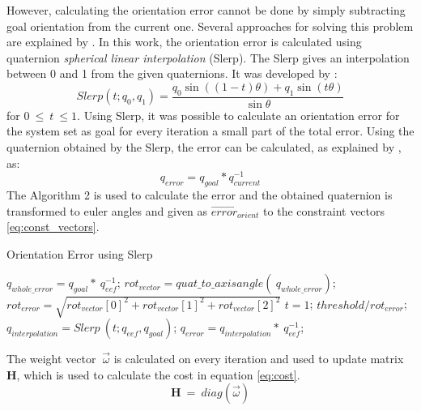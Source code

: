 However, calculating the orientation error cannot be done by simply subtracting goal orientation from the current one. Several approaches for solving this problem are explained by \cite{siciliano}. In this work, the orientation error is calculated using quaternion \textit{spherical linear interpolation} (Slerp). The Slerp gives an interpolation between 0 and 1 from the given quaternions. It was developed by \cite{slerp}:
$$ Slerp(t;q_0,q_1)=\dfrac{q_0\sin((1-t)\theta) + q_1\sin(t\theta)}{\sin\theta} 
$$
for $0\ \leq \ t\ \leq 1$. Using Slerp, it was possible to calculate an orientation error for the system set as goal for every iteration a small part of the total error. Using the quaternion obtained by the Slerp, the error can be calculated, as explained by \cite{siciliano}, as:
$$ q_{error} = q_{goal} * q_{current}^{-1} $$
The Algorithm 2 is used to calculate the error and the obtained quaternion is transformed to euler angles and given as $\vec{error}_{orient}$ to the constraint vectors \ref{eq:const_vectors}.
\begin{algorithm}[t!]
	\caption{Orientation Error using Slerp}\label{algor:error}
	\begin{algorithmic}[1]
		\vspace{2pt}
		\State $q_{whole\_error} = q_{goal} *\ q_{eef}^{-1}$;
		\vspace{2pt}
		\State $rot_{vector} = quat\_to\_axisangle(\ q_{whole\_error})$;
		\vspace{3pt}
		\State $rot_{error}  = \sqrt{rot_{vector}[0]^{2} + rot_{vector}[1]^{2} + rot_{vector}[2]^{2}}$
		\vspace{3pt}
		\vspace{2pt}
		\State $t = 1$;
		\vspace{1pt}
		\Else 
		\State $threshold / rot_{error}$;\EndIf
		\vspace{1pt}
		\State $q_{interpolation} = Slerp\ (t;q_{eef},q_{goal})$;
		\vspace{1pt}
		\State $q_{error} = q_{interpolation} *\ q_{eef}^{-1}$;
		\vspace{-1pt}
	\end{algorithmic}
\end{algorithm}


The weight vector $\ \vec{\omega}$ is calculated on every iteration and used to update matrix $\textbf{H}$, which is used to calculate the cost in equation \ref{eq:cost}. 
\begin{equation}
	\textbf{H}\ =\ diag(\vec{\omega})
	\label{eq:h}
\end{equation}

